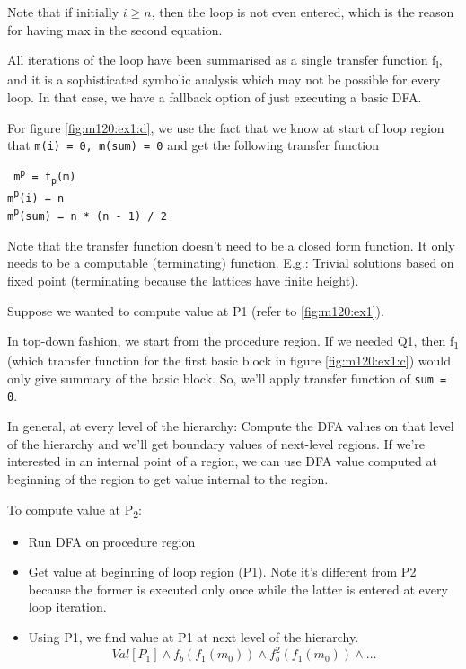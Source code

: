Note that if initially $i \geq n$, then the loop is not even entered, which
is the reason for having max in the second equation.

All iterations of the loop have been summarised as a single transfer function
f\textsubscript{l}, and it is a sophisticated symbolic analysis which may not
be possible for every loop. In that case, we have a fallback option of just
executing a basic DFA.

For figure \autoref{fig:m120:ex1:d}, we use the fact that we know at start of loop
region that \texttt{m(i) = 0, m(sum) = 0} and get the following transfer
function

{
    \tt
    \centering
    m\textsuperscript{p} = f\textsubscript{p}(m) \\
    m\textsuperscript{p}(i) = n \\
    m\textsuperscript{p}(sum) = n * (n - 1) / 2 \\
}

Note that the transfer function doesn't need to be a closed form function. It
only needs to be a computable (terminating) function.
E.g.: Trivial solutions based on fixed point (terminating because the lattices
have finite height).

Suppose we wanted to compute value at P1 (refer to \autoref{fig:m120:ex1}).

In top-down fashion, we start from the procedure region. If we needed Q1,
then f\textsubscript{1} (which transfer function for the first basic block
in figure \autoref{fig:m120:ex1:c}) would only give summary of the basic block.
So, we'll apply transfer function of \texttt{sum = 0}.

In general, at every level of the hierarchy: Compute the DFA values on that level
of the hierarchy and we'll get boundary values of next-level regions. If we're
interested in an internal point of a region, we can use DFA value computed at 
beginning of the region to get value internal to the region.

To compute value at P\textsubscript{2}:
\begin{itemize}
    \item Run DFA on procedure region
    \item Get value at beginning of loop region (P1). Note it's different
    from P2 because the former is executed only once while the latter is entered
    at every loop iteration.
    \item Using P1, we find value at P1 at next level of the hierarchy.
    \[Val[P_1] \wedge f_b(f_1(m_0)) \wedge f_b^2(f_1(m_0)) \wedge \ldots\]
\end{itemize}